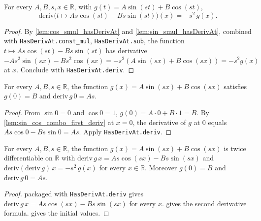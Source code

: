 \begin{lemma}
    \label{lem:sin_cos_combo_second_deriv}
    \leanok
    For every $A, B, s, x \in \mathbb{R}$, with $g(t) = A \sin(st) + B \cos(st)$,
    \[ \mathrm{deriv}\bigl(t \mapsto A s \cos(st) - B s \sin(st)\bigr)(x)
       = -s^2 \, g(x). \]
\end{lemma}
\begin{proof}
    By \cref{lem:cos_smul_hasDerivAt} and \cref{lem:sin_smul_hasDerivAt},
    combined with \texttt{HasDerivAt.const\_mul}, \texttt{HasDerivAt.sub}, the
    function $t \mapsto A s \cos(st) - B s \sin(st)$ has derivative
    $-A s^2 \sin(sx) - B s^2 \cos(sx) = -s^2(A\sin(sx) + B\cos(sx)) = -s^2 g(x)$
    at $x$. Conclude with \texttt{HasDerivAt.deriv}.
\end{proof}

\begin{lemma}
    \label{lem:sin_cos_combo_initial_values}
    For every $A, B, s \in \mathbb{R}$, the function
    $g(x) = A \sin(sx) + B \cos(sx)$ satisfies $g(0) = B$ and
    $\mathrm{deriv}\, g\, 0 = A s$.
\end{lemma}
\begin{proof}
    From $\sin 0 = 0$ and $\cos 0 = 1$, $g(0) = A \cdot 0 + B \cdot 1 = B$. By
    \cref{lem:sin_cos_combo_first_deriv} at $x = 0$, the derivative of $g$ at
    $0$ equals $A s \cos 0 - B s \sin 0 = A s$. Apply \texttt{HasDerivAt.deriv}.
\end{proof}

\begin{lemma}
    \label{lem:sin_cos_combo_solves_ode}
    \leanok
    For every $A, B, s \in \mathbb{R}$, the function
    $g(x) = A \sin(sx) + B \cos(sx)$ is twice differentiable on $\mathbb{R}$ with
    $\mathrm{deriv}\, g\, x = A s \cos(sx) - B s \sin(sx)$ and
    $\mathrm{deriv}(\mathrm{deriv}\, g)\, x = -s^2 \, g(x)$ for every
    $x \in \mathbb{R}$. Moreover $g(0) = B$ and $\mathrm{deriv}\, g\, 0 = A s$.
\end{lemma}
\begin{proof}
     packaged with \texttt{HasDerivAt.deriv}
    gives $\mathrm{deriv}\, g\, x = A s \cos(sx) - B s \sin(sx)$ for every $x$.
     gives the second derivative formula.
     gives the initial values.
\end{proof}

